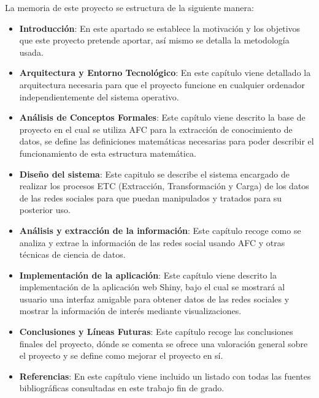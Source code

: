 \documentclass[../../main.tex]{subfiles}
\begin{document}
La memoria de este proyecto se estructura de la siguiente manera:

\begin{itemize}
    \item \textbf{Introducción}: En este apartado se establece la motivación y los objetivos que este proyecto pretende aportar, así mismo se detalla la metodología usada.
    
    \item \textbf{Arquitectura y Entorno Tecnológico}: En este capítulo viene detallado la arquitectura necesaria para que el proyecto funcione en cualquier ordenador independientemente del sistema operativo.
    
    \item \textbf{Análisis de Conceptos Formales}: Este capítulo viene descrito la base de proyecto en el cual se utiliza AFC para la extracción de conocimiento de datos, se define las definiciones matemáticas necesarias para poder describir el funcionamiento de esta estructura matemática. 
    
    \item \textbf{Diseño del sistema}: Este capitulo se describe el sistema encargado de realizar los procesos ETC (Extracción, Transformación y Carga) de los datos de las redes sociales para que puedan manipulados y tratados para su posterior uso.
    
    \item \textbf{Análisis y extracción de la información}: Este capítulo recoge como se analiza y extrae la información de las redes social usando AFC y otras técnicas de ciencia de datos.
    
    \item \textbf{Implementación de la aplicación}: Este capítulo viene descrito la implementación de la aplicación web Shiny, bajo el cual se mostrará al usuario una interfaz amigable para obtener datos de las redes sociales y mostrar la información de interés mediante visualizaciones.
    
    \item \textbf{Conclusiones y Líneas Futuras}: Este capítulo recoge las conclusiones finales del proyecto, dónde se comenta se ofrece una valoración general sobre el proyecto y se define como mejorar el proyecto en sí.
    
    \item \textbf{Referencias}: En este capítulo viene incluido un listado con todas las fuentes bibliográficas consultadas en este trabajo fin de grado.
    
\end{itemize}
\end{document}
